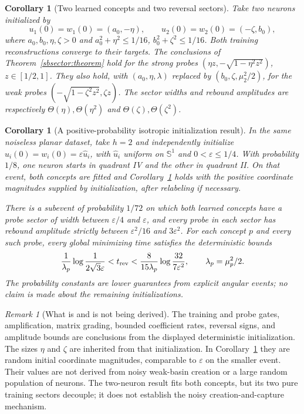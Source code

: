 \documentclass{article} %
\theoremstyle{plain}
\newtheorem{corollary}[theorem]{Corollary}
\theoremstyle{definition}
\theoremstyle{remark}
\newtheorem{remark}[theorem]{Remark}
\begin{document}
\begin{corollary}[Two learned concepts and two reversal sectors]
\label{sbsector:two-concept}
Take two neurons initialized by
\[
 u_1(0)=w_1(0)=(a_0,-\eta),\qquad
 u_2(0)=w_2(0)=(-\zeta,b_0),
\]
where $a_0,b_0,\eta,\zeta>0$ and
$a_0^2+\eta^2\le1/16$, $b_0^2+\zeta^2\le1/16$.
Both training reconstructions converge to their targets. The conclusions
of Theorem~\ref{sbsector:theorem} hold for the strong probes
$(\eta z,-\sqrt{1-\eta^2z^2})$, $z\in[1/2,1]$.
They also hold, with $(a_0,\eta,\lambda)$ replaced by
$(b_0,\zeta,\mu_2^2/2)$, for the weak probes
$(-\sqrt{1-\zeta^2z^2},\zeta z)$.
The sector widths and rebound amplitudes are respectively
$\Theta(\eta),\Theta(\eta^2)$ and
$\Theta(\zeta),\Theta(\zeta^2)$.
\end{corollary}

\begin{corollary}[A positive-probability isotropic initialization result]
\label{sbsector:isotropic}
In the same noiseless planar dataset, take $h=2$ and independently
initialize $u_i(0)=w_i(0)=\varepsilon\widehat u_i$, with
$\widehat u_i$ uniform on $\mathbb S^1$ and $0<\varepsilon\le1/4$.
With probability $1/8$, one neuron starts in quadrant IV and the other
in quadrant II. On that event, both concepts are fitted and
Corollary~\ref{sbsector:two-concept} holds with the positive coordinate
magnitudes supplied by initialization, after relabeling if necessary.

There is a subevent of probability $1/72$ on which both learned
concepts have a probe sector of width between $\varepsilon/4$ and
$\varepsilon$, and every probe in each sector has rebound amplitude
strictly between $\varepsilon^2/16$ and $3\varepsilon^2$.
For each concept $p$ and every such probe, every global minimizing time
satisfies the deterministic bounds
\begin{equation}\label{sbsector:isotropic-time}
 \frac1{\lambda_p}\log\frac1{2\sqrt3\varepsilon}
 <t_{\rm rev}
 <\frac8{15\lambda_p}\log\frac{32}{7\varepsilon^2},
 \qquad \lambda_p=\mu_p^2/2.
\end{equation}
The probability constants are lower guarantees from explicit angular
events; no claim is made about the remaining initializations.
\end{corollary}

\begin{remark}[What is and is not being derived]
The training and probe gates, amplification, matrix grading, bounded
coefficient rates, reversal signs, and amplitude bounds are conclusions
from the displayed deterministic initialization. The sizes $\eta$ and
$\zeta$ are inherited from that initialization. In
Corollary~\ref{sbsector:isotropic} they are random initial coordinate
magnitudes, comparable to $\varepsilon$ on the smaller event. Their
values are not derived from noisy weak-basin creation or a large
random population of neurons. The two-neuron result fits both concepts,
but its two pure training sectors decouple; it does not establish the
noisy creation-and-capture mechanism.
\end{remark}
\end{document}
